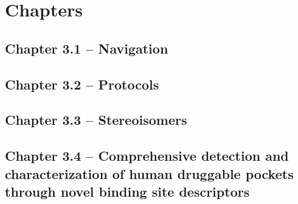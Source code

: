 
\chapter{Chapters}
\newpage


\section{Chapter 3.1 -- Navigation}





\newpage



\section{Chapter 3.2 -- Protocols}





\newpage



\section{Chapter 3.3 -- Stereoisomers}





\newpage



\section{Chapter 3.4 -- Comprehensive detection and characterization of human druggable pockets through novel binding site descriptors}






\newpage
